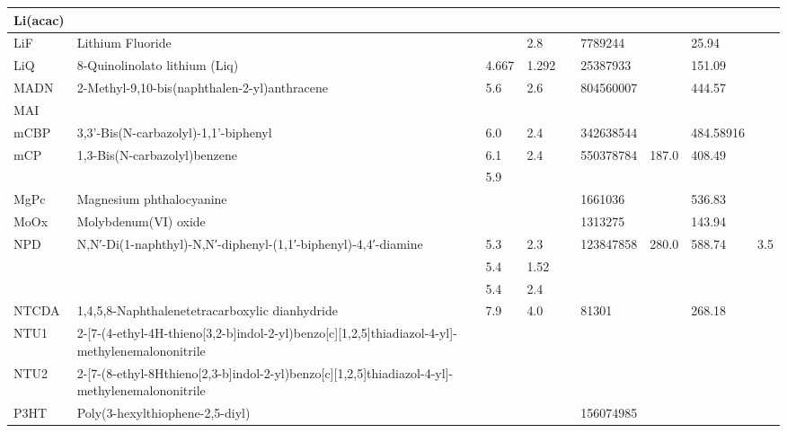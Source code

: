 \documentclass{article}
\begin{document}
\begin{landscape}
\begin{longtable}{| p{} | p{} | p{} | p{} | p{} | p{} | p{} | p{} | p{} | p{} | }
 \hline 
Li(acac) &  &  &  &  &  &  &  &  &  \\ 
 
 \hline 
LiF & Lithium Fluoride &  &  & 2.8 &  & 7789244 &  & 25.94 &  \\ 
 
 \hline 
LiQ & 8-Quinolinolato lithium (Liq) &  & 4.667 & 1.292 &  & 25387933 &  & 151.09 &  \\ 
 
 \hline 
MADN & 2-Methyl-9,10-bis(naphthalen-2-yl)anthracene &  & 5.6 & 2.6 &  & 804560007 &  & 444.57 &  \\ 
 
 \hline 
MAI &  &  &  &  &  &  &  &  &  \\ 
 
 \hline 
mCBP & 3,3'-Bis(N-carbazolyl)-1,1'-biphenyl &  & 6.0 & 2.4 &  & 342638544 &  & 484.58916 &  \\ 
 
 \hline 
mCP & 1,3-Bis(N-carbazolyl)benzene &  & 6.1 & 2.4 &  & 550378784 & 187.0 & 408.49 &  \\ 
 & &  & 5.9 &  &  &  & & & \\ 
 
 \hline 
MgPc & Magnesium phthalocyanine &  &  &  &  & 1661036 &  & 536.83 &  \\ 
 
 \hline 
MoOx & Molybdenum(VI) oxide &  &  &  &  & 1313275 &  & 143.94 &  \\ 
 
 \hline 
NPD & N,N′-Di(1-naphthyl)-N,N′-diphenyl-(1,1′-biphenyl)-4,4′-diamine &  & 5.3 & 2.3 &  & 123847858 & 280.0 & 588.74 & 3.5 \\ 
 & &  & 5.4 & 1.52 &  &  & & & \\ 
 & &  & 5.4 & 2.4 &  &  & & & \\ 
 
 \hline 
NTCDA & 1,4,5,8-Naphthalenetetracarboxylic dianhydride &  & 7.9 & 4.0 &  & 81301 &  & 268.18 &  \\ 
 
 \hline 
NTU1 & 2-{[7-(4-ethyl-4H-thieno[3,2-b]indol-2-yl)benzo[c][1,2,5]thiadiazol-4-yl]-methylene}malononitrile &  &  &  &  &  &  &  &  \\ 
 
 \hline 
NTU2 & 2-{[7-(8-ethyl-8Hthieno[2,3-b]indol-2-yl)benzo[c][1,2,5]thiadiazol-4-yl]-methylene}malononitrile &  &  &  &  &  &  &  &  \\ 
 
 \hline 
P3HT & Poly(3-hexylthiophene-2,5-diyl) &  &  &  &  & 156074985 &  &  &  \\ 
 

\end{longtable}
\end{landscape}
\end{document}
